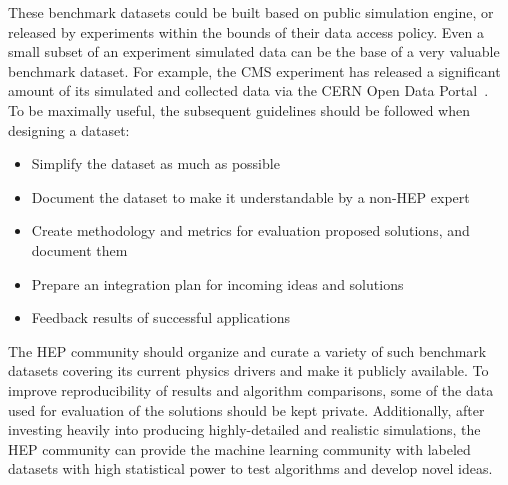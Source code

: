 These benchmark datasets could be built based on public simulation engine, or released by experiments within the bounds of their data access policy. Even a small subset of an experiment simulated data can be the base of a very valuable benchmark dataset. For example, the CMS experiment has released a significant amount of its simulated and collected data via the CERN Open Data Portal~\cite{opendata}.\\

To be maximally useful, the subsequent guidelines should be followed when designing a dataset:
\begin{itemize}
 \item Simplify the dataset as much as possible
 \item Document the dataset to make it understandable by a non-HEP expert
 \item Create methodology and metrics for evaluation proposed solutions, and document them
 \item Prepare an integration plan for incoming ideas and solutions
 \item Feedback results of successful applications
\end{itemize}



The HEP community should organize and curate a variety of such benchmark datasets covering its current physics drivers and make it publicly available. To improve reproducibility of results and algorithm comparisons, some of the data used for evaluation of the solutions should be kept private.
Additionally, after investing heavily into producing highly-detailed and realistic simulations, the HEP community can provide the machine learning community with labeled datasets with high statistical power to test algorithms and develop novel ideas.


